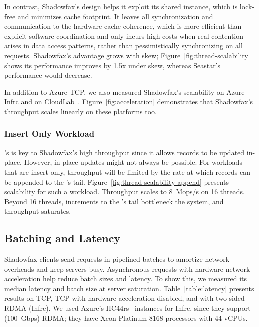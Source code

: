 In contrast, Shadowfax's design helps it exploit its shared \faster instance,
which is lock-free and minimizes cache footprint.
%
It leaves all synchronization and communication to the hardware
cache coherence, which is more efficient than explicit software
coordination and only incurs high costs when real contention arises in data
access patterns, rather than pessimistically synchronizing on all requests.
%
Shadowfax's advantage grows with skew;
Figure~\ref{fig:thread-scalability} shows its performance improves by 1.5x
under skew, whereas Seastar's performance would decrease.
%
%

In addition to Azure TCP, we also measured Shadowfax's scalability on
Azure Infrc and on CloudLab~\cite{cloudlab}.
%
Figure~\ref{fig:acceleration} demonstrates that Shadowfax's throughput
scales linearly on these platforms too.

\subsubsection{Insert Only Workload}
\label{sec:eval:append-only}

\faster's \hlog is key to Shadowfax's high throughput since it allows
records to be updated in-place.
%
However, in-place updates might not always be possible.
%
For workloads that are insert only, throughput will be limited by the
rate at which records can be appended to the \hlog's tail.
%
Figure~\ref{fig:thread-scalability-append} presents scalability for
such a workload.
%
Throughput scales to 8~Mops/s on 16 threads.
%
Beyond 16 threads, increments to the \hlog's tail bottleneck the system,
and throughput saturates.

\subsection{Batching and Latency}
\label{sec:eval:latency}

Shadowfax clients send requests in pipelined batches to amortize
network overheads and keep servers busy.
%
Asynchronous requests with hardware network acceleration
help reduce batch sizes and latency.
%
To show this, we measured its median latency and batch size at
server saturation.
%
%
Table~\ref{table:latency} presents results on TCP, TCP with
hardware acceleration disabled, and with two-sided RDMA (Infrc).
%
We used Azure's HC44rs~\cite{hc44} instances for Infrc, since they support
(100~Gbps) RDMA; they have Xeon Platinum 8168 processors with 44 vCPUs.
%
%
%

